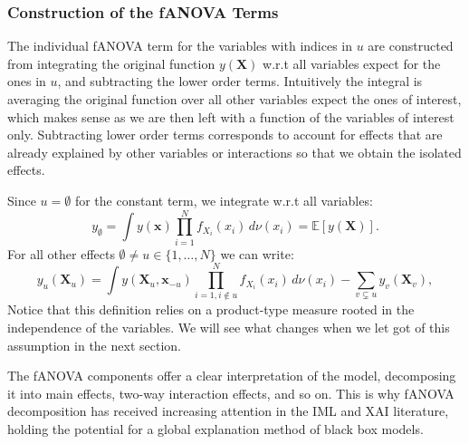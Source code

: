 
\subsubsection*{Construction of the fANOVA Terms}
The individual fANOVA term for the variables with indices in $u$ are constructed from integrating the original function $y(\boldsymbol{X})$ w.r.t all variables expect for the ones in $u$, and subtracting the lower order terms. Intuitively the integral is averaging the original function over all other variables expect the ones of interest, which makes sense as we are then left with a function of the variables of interest only. Subtracting lower order terms corresponds to account for effects that are already explained by other variables or interactions so that we obtain the isolated effects.\par
Since $u = \emptyset$ for the constant term, we integrate w.r.t all variables:
\begin{equation}
    y_{\emptyset} = \int y(\boldsymbol{x}) \prod_{i=1}^{N} f_{X_i}(x_i) \, d\nu (x_i) = \mathbb{E}[y(\boldsymbol{X})].
    \label{eq:intercept}
\end{equation}
For all other effects $\emptyset \neq u \in \{1, \dots, N\}$ we can write:
\begin{equation}
    y_u(\boldsymbol{X}_u) = \int y(\boldsymbol{X}_u, \boldsymbol{x}_{-u}) \prod_{i=1, i \notin u}^{N} f_{X_i}(x_i) \, d\nu (x_i)- \sum_{v \subsetneq u} y_v(\boldsymbol{X}_v),
    \label{eq:fanova_component}
\end{equation}
Notice that this definition relies on a product-type measure rooted in the independence of the variables. We will see what changes when we let got of this assumption in the next section.\par
The fANOVA components offer a clear interpretation of the model, decomposing it into main effects, two-way interaction effects, and so on. This is why fANOVA decomposition has received increasing attention in the IML and XAI literature, holding the potential for a global explanation method of black box models.\par

